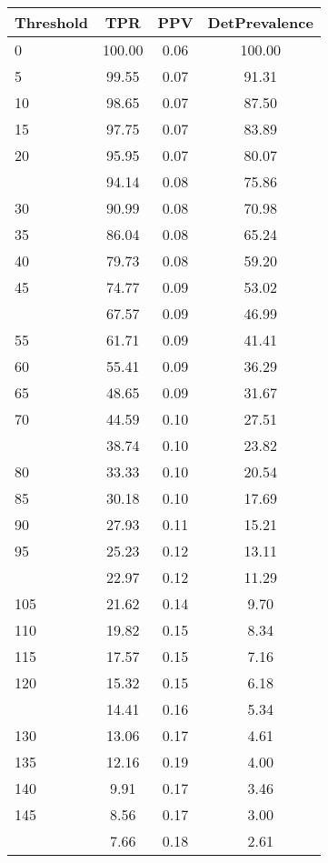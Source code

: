 \begin{table}[ht]
\centering
\begin{tabular}{lccc}
  \toprule
Threshold & TPR & PPV & DetPrevalence \\ 
  \midrule
0 & 100.00 & 0.06 & 100.00 \\ 
  5 & 99.55 & 0.07 & 91.31 \\ 
  10 & 98.65 & 0.07 & 87.50 \\ 
  15 & 97.75 & 0.07 & 83.89 \\ 
  20 & 95.95 & 0.07 & 80.07 \\ 
   \addlinespace
25 & 94.14 & 0.08 & 75.86 \\ 
  30 & 90.99 & 0.08 & 70.98 \\ 
  35 & 86.04 & 0.08 & 65.24 \\ 
  40 & 79.73 & 0.08 & 59.20 \\ 
  45 & 74.77 & 0.09 & 53.02 \\ 
   \addlinespace
50 & 67.57 & 0.09 & 46.99 \\ 
  55 & 61.71 & 0.09 & 41.41 \\ 
  60 & 55.41 & 0.09 & 36.29 \\ 
  65 & 48.65 & 0.09 & 31.67 \\ 
  70 & 44.59 & 0.10 & 27.51 \\ 
   \addlinespace
75 & 38.74 & 0.10 & 23.82 \\ 
  80 & 33.33 & 0.10 & 20.54 \\ 
  85 & 30.18 & 0.10 & 17.69 \\ 
  90 & 27.93 & 0.11 & 15.21 \\ 
  95 & 25.23 & 0.12 & 13.11 \\ 
   \addlinespace
100 & 22.97 & 0.12 & 11.29 \\ 
  105 & 21.62 & 0.14 & 9.70 \\ 
  110 & 19.82 & 0.15 & 8.34 \\ 
  115 & 17.57 & 0.15 & 7.16 \\ 
  120 & 15.32 & 0.15 & 6.18 \\ 
   \addlinespace
125 & 14.41 & 0.16 & 5.34 \\ 
  130 & 13.06 & 0.17 & 4.61 \\ 
  135 & 12.16 & 0.19 & 4.00 \\ 
  140 & 9.91 & 0.17 & 3.46 \\ 
  145 & 8.56 & 0.17 & 3.00 \\ 
   \addlinespace
150 & 7.66 & 0.18 & 2.61 \\ 

\end{tabular}
\end{table}
